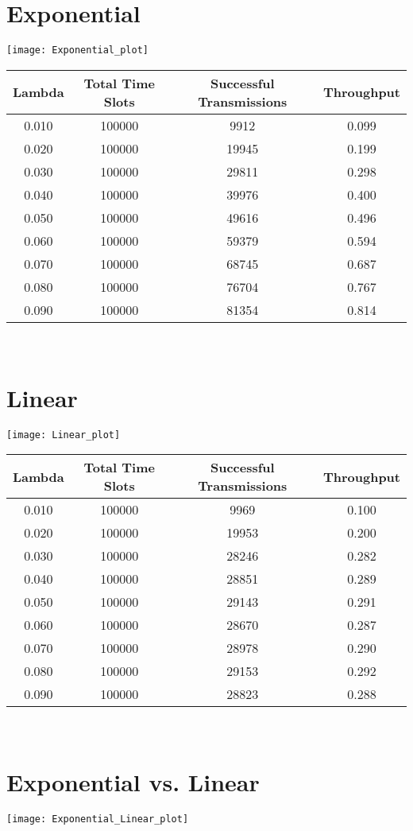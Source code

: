 \documentclass{article}
\begin{document}
\section*{Exponential}
\begin{center}
\texttt{[image: Exponential\_plot]}
\begin{tabular}{c | c | c | c}
	Lambda    & Total Time Slots & Successful Transmissions & Throughput \\
	\hline
	0.010     & 100000    & 9912      & 0.099     \\
	0.020     & 100000    & 19945     & 0.199     \\
	0.030     & 100000    & 29811     & 0.298     \\
	0.040     & 100000    & 39976     & 0.400     \\
	0.050     & 100000    & 49616     & 0.496     \\
	0.060     & 100000    & 59379     & 0.594     \\
	0.070     & 100000    & 68745     & 0.687     \\
	0.080     & 100000    & 76704     & 0.767     \\
	0.090     & 100000    & 81354     & 0.814     \\
\end{tabular} \\
\end{center}

\section*{Linear}
\begin{center}
\texttt{[image: Linear\_plot]}
\begin{tabular}{c | c | c | c}
	Lambda    & Total Time Slots & Successful Transmissions & Throughput \\
	\hline
	0.010     & 100000    & 9969      & 0.100     \\
	0.020     & 100000    & 19953     & 0.200     \\
	0.030     & 100000    & 28246     & 0.282     \\
	0.040     & 100000    & 28851     & 0.289     \\
	0.050     & 100000    & 29143     & 0.291     \\
	0.060     & 100000    & 28670     & 0.287     \\
	0.070     & 100000    & 28978     & 0.290     \\
	0.080     & 100000    & 29153     & 0.292     \\
	0.090     & 100000    & 28823     & 0.288     \\
\end{tabular} \\
\end{center}

\section*{Exponential vs. Linear}
\begin{center}
\texttt{[image: Exponential\_Linear\_plot]}
\end{center}
\end{document}
